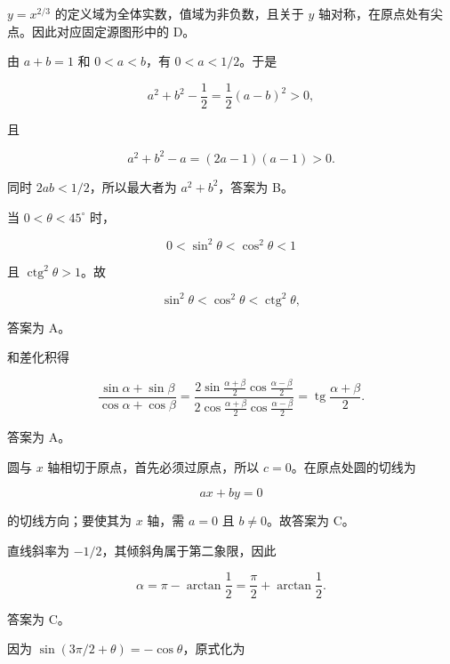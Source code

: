 \begin{answer}

$y=x^{2/3}$ 的定义域为全体实数，值域为非负数，且关于 $y$ 轴对称，在原点处有尖点。因此对应固定源图形中的 D。


由 $a+b=1$ 和 $0<a<b$，有 $0<a<1/2$。于是

\nopagebreak[4]
\[
a^2+b^2-\frac12=\frac12(a-b)^2>0,
\]

且

\nopagebreak[4]
\[
a^2+b^2-a=(2a-1)(a-1)>0.
\]

同时 $2ab<1/2$，所以最大者为 $a^2+b^2$，答案为 B。


当 $0<\theta<45^\circ$ 时，

\nopagebreak[4]
\[
0<\sin^2\theta<\cos^2\theta<1
\]

且 $\operatorname{ctg}^2\theta>1$。故

\nopagebreak[4]
\[
\sin^2\theta<\cos^2\theta<\operatorname{ctg}^2\theta,
\]

答案为 A。


和差化积得

\nopagebreak[4]
\[
\frac{\sin\alpha+\sin\beta}{\cos\alpha+\cos\beta}
=\frac{2\sin\frac{\alpha+\beta}{2}\cos\frac{\alpha-\beta}{2}}
{2\cos\frac{\alpha+\beta}{2}\cos\frac{\alpha-\beta}{2}}
=\operatorname{tg}\frac{\alpha+\beta}{2}.
\]

答案为 A。


圆与 $x$ 轴相切于原点，首先必须过原点，所以 $c=0$。在原点处圆的切线为

\nopagebreak[4]
\[
ax+by=0
\]

的切线方向；要使其为 $x$ 轴，需 $a=0$ 且 $b\ne0$。故答案为 C。


直线斜率为 $-1/2$，其倾斜角属于第二象限，因此

\nopagebreak[4]
\[
\alpha=\pi-\arctan\frac12
=\frac\pi2+\arctan\frac12.
\]

答案为 C。


因为 $\sin(3\pi/2+\theta)=-\cos\theta$，原式化为


\end{answer}
